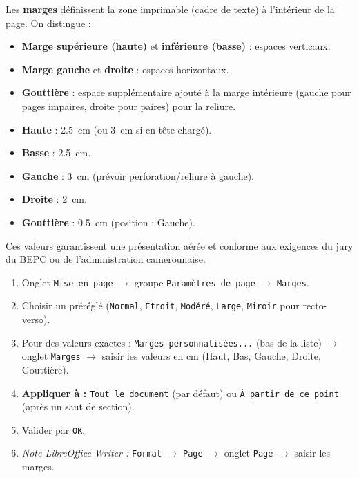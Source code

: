 \documentclass[11pt]{article}
\begin{document}
\begin{definition}[Marges]
    Les \textbf{marges} définissent la zone imprimable (cadre de texte) à l'intérieur de la page. On distingue :
    \begin{itemize}
        \item \textbf{Marge supérieure (haute)} et \textbf{inférieure (basse)} : espaces verticaux.
        \item \textbf{Marge gauche} et \textbf{droite} : espaces horizontaux.
        \item \textbf{Gouttière} : espace supplémentaire ajouté à la marge intérieure (gauche pour pages impaires, droite pour paires) pour la reliure.
    \end{itemize}
\end{definition}

\begin{exemplebox}
    \begin{itemize}
        \item \textbf{Haute} : \SI{2,5}{\centi\meter} (ou \SI{3}{\centi\meter} si en-tête chargé).
        \item \textbf{Basse} : \SI{2,5}{\centi\meter}.
        \item \textbf{Gauche} : \SI{3}{\centi\meter} (prévoir perforation/reliure à gauche).
        \item \textbf{Droite} : \SI{2}{\centi\meter}.
        \item \textbf{Gouttière} : \SI{0,5}{\centi\meter} (position : Gauche).
    \end{itemize}
    Ces valeurs garantissent une présentation aérée et conforme aux exigences du jury du BEPC ou de l'administration camerounaise.
\end{exemplebox}

\begin{methode}
    \begin{enumerate}
        \item Onglet \texttt{Mise en page} $\rightarrow$ groupe \texttt{Paramètres de page} $\rightarrow$ \texttt{Marges}.
        \item Choisir un préréglé (\texttt{Normal}, \texttt{Étroit}, \texttt{Modéré}, \texttt{Large}, \texttt{Miroir} pour recto-verso).
        \item Pour des valeurs exactes : \texttt{Marges personnalisées...} (bas de la liste) $\rightarrow$ onglet \texttt{Marges} $\rightarrow$ saisir les valeurs en cm (Haut, Bas, Gauche, Droite, Gouttière).
        \item \textbf{Appliquer à :} \texttt{Tout le document} (par défaut) ou \texttt{À partir de ce point} (après un saut de section).
        \item Valider par \texttt{OK}.
        \item \textit{Note LibreOffice Writer :} \texttt{Format} $\rightarrow$ \texttt{Page} $\rightarrow$ onglet \texttt{Page} $\rightarrow$ saisir les marges.
    \end{enumerate}
\end{methode}
\end{document}
